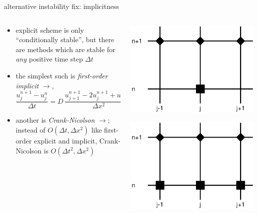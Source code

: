 \begin{frame}{alternative instability fix: implicitness}

\begin{columns}[T]
\begin{column}{0.7\textwidth}
\small
\begin{itemize}
\item explicit scheme is only ``conditionally stable'', but there are methods which are stable for \emph{any} positive time step $\Delta t$
\item the simplest such is \emph{first-order implicit} $\to$,
	$$\frac{u_j^{n+1} - u_j^n}{\Delta t} = D\,\frac{u_{j+1}^{n+1} - 2 u_j^{n+1} + u_{j-1}^{n+1}}{\Delta x^2}$$
\item another is \emph{Crank-Nicolson} $\to$; instead of $O(\Delta t,\Delta x^2)$ like first-order explicit and implicit, Crank-Nicolson is $O(\Delta t^2,\Delta x^2)$
\end{itemize}
\end{column}
\begin{column}{0.3\textwidth}
\includegraphics[width=1.2\textwidth]{pdffigs/impstencil}

\bigskip
\includegraphics[width=1.2\textwidth]{pdffigs/cnstencil}
\end{column}
\end{columns}


\end{frame}
